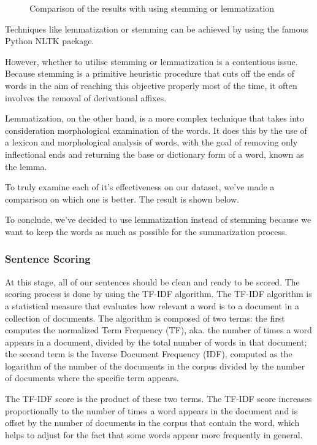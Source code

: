 \begin{figure}[H]
\caption{Comparison of the results with using stemming or lemmatization }\label{stem_lem_comparison}
\end{figure}

\pagebreak
\noindent Techniques like lemmatization or stemming can be achieved by using the famous Python NLTK package.

However, whether to utilise stemming or lemmatization is a contentious issue. Because stemming is a primitive heuristic procedure that cuts off the ends of words in the aim of reaching this objective properly most of the time, it often involves the removal of derivational affixes. 

Lemmatization, on the other hand, is a more complex technique that takes into consideration morphological examination of the words. It does this by the use of a lexicon and morphological analysis of words, with the goal of removing only inflectional ends and returning the base or dictionary form of a word, known as the lemma.

To truly examine each of it's effectiveness on our dataset, we've made a comparison on which one is better. The result is shown below.

\noindent To conclude, we've decided to use lemmatization instead of stemming because we want to keep the words as much as possible for the summarization process.

\pagebreak
\subsubsection{Sentence Scoring}
At this stage, all of our sentences should be clean and ready to be scored. The scoring process is done by using the TF-IDF algorithm. The TF-IDF algorithm is a statistical measure that evaluates how relevant a word is to a document in a collection of documents. The algorithm is composed of two terms: the first computes the normalized Term Frequency (TF), aka. the number of times a word appears in a document, divided by the total number of words in that document; the second term is the Inverse Document Frequency (IDF), computed as the logarithm of the number of the documents in the corpus divided by the number of documents where the specific term appears.

The TF-IDF score is the product of these two terms. The TF-IDF score increases proportionally to the number of times a word appears in the document and is offset by the number of documents in the corpus that contain the word, which helps to adjust for the fact that some words appear more frequently in general.

